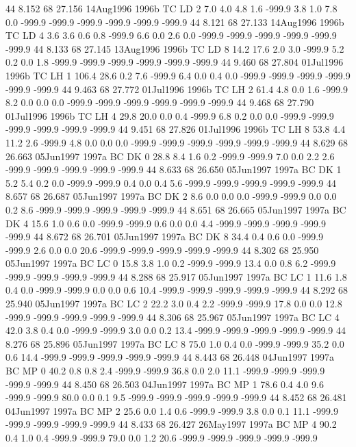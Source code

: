 44 8.152	68 27.156	14Aug1996	1996b	TC	LD	2	7.0	4.0	4.8	1.6	-999.9	3.8	1.0	7.8	0.0	-999.9	-999.9	-999.9	-999.9	-999.9	-999.9
44 8.121	68 27.133	14Aug1996	1996b	TC	LD	4	3.6	3.6	0.6	0.8	-999.9	6.6	0.0	2.6	0.0	-999.9	-999.9	-999.9	-999.9	-999.9	-999.9
44 8.133	68 27.145	13Aug1996	1996b	TC	LD	8	14.2	17.6	2.0	3.0	-999.9	5.2	0.2	0.0	1.8	-999.9	-999.9	-999.9	-999.9	-999.9	-999.9
44 9.460	68 27.804	01Jul1996	1996b	TC	LH	1	106.4	28.6	0.2	7.6	-999.9	6.4	0.0	0.4	0.0	-999.9	-999.9	-999.9	-999.9	-999.9	-999.9
44 9.463	68 27.772	01Jul1996	1996b	TC	LH	2	61.4	4.8	0.0	1.6	-999.9	8.2	0.0	0.0	0.0	-999.9	-999.9	-999.9	-999.9	-999.9	-999.9
44 9.468	68 27.790	01Jul1996	1996b	TC	LH	4	29.8	20.0	0.0	0.4	-999.9	6.8	0.2	0.0	0.0	-999.9	-999.9	-999.9	-999.9	-999.9	-999.9
44 9.451	68 27.826	01Jul1996	1996b	TC	LH	8	53.8	4.4	11.2	2.6	-999.9	4.8	0.0	0.0	0.0	-999.9	-999.9	-999.9	-999.9	-999.9	-999.9
44 8.629	68 26.663	05Jun1997	1997a	BC	DK	0	28.8	8.4	1.6	0.2	-999.9	-999.9	7.0	0.0	2.2	2.6	-999.9	-999.9	-999.9	-999.9	-999.9
44 8.633	68 26.650	05Jun1997	1997a	BC	DK	1	5.2	5.4	0.2	0.0	-999.9	-999.9	0.4	0.0	0.4	5.6	-999.9	-999.9	-999.9	-999.9	-999.9
44 8.657	68 26.687	05Jun1997	1997a	BC	DK	2	8.6	0.0	0.0	0.0	-999.9	-999.9	0.0	0.0	0.2	8.6	-999.9	-999.9	-999.9	-999.9	-999.9
44 8.651	68 26.665	05Jun1997	1997a	BC	DK	4	15.6	1.0	0.6	0.0	-999.9	-999.9	0.6	0.0	0.0	4.4	-999.9	-999.9	-999.9	-999.9	-999.9
44 8.672	68 26.701	05Jun1997	1997a	BC	DK	8	34.4	0.4	0.6	0.0	-999.9	-999.9	2.6	0.0	0.0	20.6	-999.9	-999.9	-999.9	-999.9	-999.9
44 8.302	68 25.950	05Jun1997	1997a	BC	LC	0	15.8	3.8	1.0	0.2	-999.9	-999.9	13.4	0.0	0.8	6.2	-999.9	-999.9	-999.9	-999.9	-999.9
44 8.288	68 25.917	05Jun1997	1997a	BC	LC	1	11.6	1.8	0.4	0.0	-999.9	-999.9	0.0	0.0	0.6	10.4	-999.9	-999.9	-999.9	-999.9	-999.9
44 8.292	68 25.940	05Jun1997	1997a	BC	LC	2	22.2	3.0	0.4	2.2	-999.9	-999.9	17.8	0.0	0.0	12.8	-999.9	-999.9	-999.9	-999.9	-999.9
44 8.306	68 25.967	05Jun1997	1997a	BC	LC	4	42.0	3.8	0.4	0.0	-999.9	-999.9	3.0	0.0	0.2	13.4	-999.9	-999.9	-999.9	-999.9	-999.9
44 8.276	68 25.896	05Jun1997	1997a	BC	LC	8	75.0	1.0	0.4	0.0	-999.9	-999.9	35.2	0.0	0.6	14.4	-999.9	-999.9	-999.9	-999.9	-999.9
44 8.443	68 26.448	04Jun1997	1997a	BC	MP	0	40.2	0.8	0.8	2.4	-999.9	-999.9	36.8	0.0	2.0	11.1	-999.9	-999.9	-999.9	-999.9	-999.9
44 8.450	68 26.503	04Jun1997	1997a	BC	MP	1	78.6	0.4	4.0	9.6	-999.9	-999.9	80.0	0.0	0.1	9.5	-999.9	-999.9	-999.9	-999.9	-999.9
44 8.452	68 26.481	04Jun1997	1997a	BC	MP	2	25.6	0.0	1.4	0.6	-999.9	-999.9	3.8	0.0	0.1	11.1	-999.9	-999.9	-999.9	-999.9	-999.9
44 8.433	68 26.427	26May1997	1997a	BC	MP	4	90.2	0.4	1.0	0.4	-999.9	-999.9	79.0	0.0	1.2	20.6	-999.9	-999.9	-999.9	-999.9	-999.9
